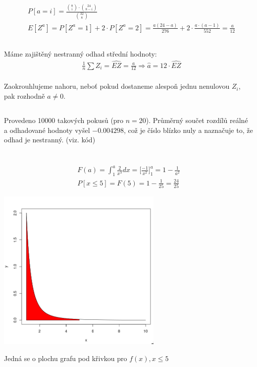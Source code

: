 \documentclass[a4paper]{article}
\begin{document}
\begin{align*}
	& P[a = i] = \frac{{8 \choose i}\cdot {24 \choose 8-i}}{{32 \choose 8}} \\	
	& E[Z^a] = P[Z^a=1] + 2\cdot P[Z^a = 2] =  \frac{a(24-a)}{276} + 2\cdot \frac{a\cdot(a-1)}{552}= \frac{a}{12}
\end{align*}

\subsection{}
Máme zajištěný nestranný odhad střední hodnoty:
\begin{align*}
	& \frac{1}{n} \sum Z_i = \widehat{EZ} = \frac{a}{12} \Rightarrow \hat{a} = 12\cdot \widehat{EZ} \\
\end{align*}

Zaokrouhlujeme nahoru, neboť pokud dostaneme alespoň jednu nenulovou $Z_i$, pak rozhodně $a \ne 0$.

\subsection{}
Provedeno 10000 takových pokusů (pro $n=20$). Průměrný součet rozdílů reálné a odhadované hodnoty vyšel $-0.004298$, což je číslo blízko nuly a naznačuje to, že odhad je nestranný. (viz. kód)


\newpage 
\section{}
\subsection{}
\begin{align*}
	F(a) = \int_1^a \frac{2}{x^3} dx = \big[\frac{-1}{x^2}\big]_1^a = 1 - \frac{1}{a^2} \\
	P[x \le 5] = F(5) = 1- \frac{1}{25} = \frac{24}{25}
\end{align*}

\begin{center}
	\includegraphics[width=0.6\textwidth]{density}
\end{center}
Jedná se o plochu grafu pod křivkou pro $f(x), x \le 5$
\end{document}
